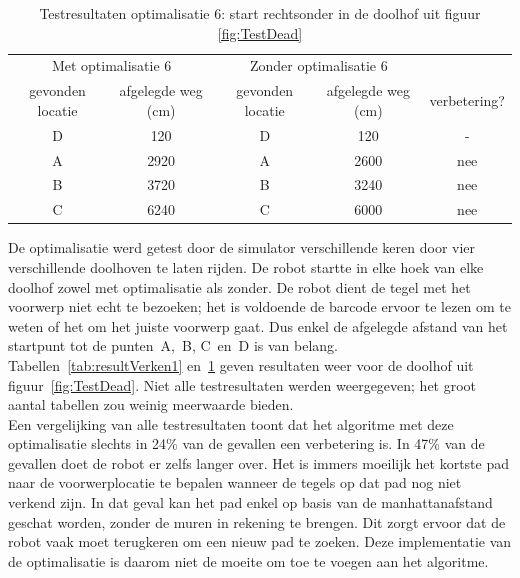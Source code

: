 \documentclass[tt3]{penoverslag}
\begin{document}
\begin{table}[h]
\begin{center}
    \begin{tabular}{c | c | c | c | c}
   \multicolumn{2}{c|}{Met optimalisatie 6} & \multicolumn{2}{|c|}{Zonder optimalisatie 6} &\\
     gevonden locatie &  afgelegde weg (cm) & gevonden locatie &  afgelegde weg (cm)& verbetering?\\ \hline\hline
    D & 120 & D & 120 & -\\ \hline
    A & 2920 & A & 2600 & nee\\ \hline
    B & 3720 & B & 3240 & nee\\ \hline
    C & 6240 & C & 6000 & nee\\
    \end{tabular}
    \caption{Testresultaten optimalisatie 6: start rechtsonder in de doolhof uit figuur \ref{fig:TestDead}}
    \label{tab:resultVerken2}
\end{center}
\end{table}

De optimalisatie werd getest door de simulator verschillende keren door vier verschillende doolhoven te laten rijden. De robot startte in elke hoek van elke doolhof zowel met optimalisatie als zonder. De robot dient de tegel met het voorwerp niet echt te bezoeken; het is voldoende de barcode ervoor te lezen om te weten of het om het juiste voorwerp gaat. Dus enkel de afgelegde afstand van het startpunt tot de punten~A,~B, C~en~D is van belang. Tabellen~\ref{tab:resultVerken1} en~\ref{tab:resultVerken2} geven resultaten weer voor de doolhof uit figuur~\ref{fig:TestDead}. Niet alle testresultaten werden weergegeven; het groot aantal tabellen zou weinig meerwaarde bieden.\\

Een vergelijking van alle testresultaten toont dat het algoritme met deze optimalisatie slechts in 24\% van de gevallen een verbetering is. In 47\% van de gevallen doet de robot er zelfs langer over. Het is immers moeilijk het kortste pad naar de voorwerplocatie te bepalen wanneer de tegels op dat pad nog niet verkend zijn. In dat geval kan het pad enkel op basis van de manhattanafstand geschat worden, zonder de muren in rekening te brengen. Dit zorgt ervoor dat de robot vaak moet terugkeren om een nieuw pad te zoeken. Deze implementatie van de optimalisatie is daarom niet de moeite om toe te voegen aan het algoritme. \\
\end{document}
